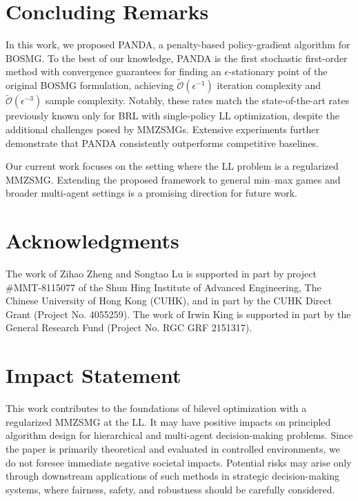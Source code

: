 \documentclass{article}
\theoremstyle{plain}
\theoremstyle{definition}
\theoremstyle{remark}
\def\cO{\mathcal O}
\begin{document}
\vspace{-2mm}

\section{Concluding Remarks}
In this work, we proposed PANDA, a penalty-based policy-gradient algorithm
for BOSMG. To the best of our knowledge, PANDA is the first stochastic
first-order method with convergence guarantees for finding an
$\epsilon$-stationary point of the original BOSMG formulation, achieving
$\tilde{\cO}(\epsilon^{-1})$ iteration complexity and
$\tilde{\cO}(\epsilon^{-3})$ sample complexity. Notably, these rates match
the state-of-the-art rates previously known only for BRL with single-policy
LL optimization, despite the additional challenges posed by MMZSMGs.
Extensive experiments further demonstrate that PANDA consistently outperforms
competitive baselines.

\vspace{-1mm}
Our current work focuses on the setting where the LL problem is a regularized
MMZSMG. Extending the proposed framework to general min--max games and broader
multi-agent settings is a promising direction for future work.



\vspace{-2mm}
\section*{Acknowledgments}
The work of Zihao Zheng and Songtao Lu is supported in part by project \#MMT-8115077 of the Shun Hing Institute of Advanced Engineering, The Chinese University of Hong Kong (CUHK), and in part by the CUHK Direct Grant (Project No. 4055259). The work of Irwin King is supported in part by the General Research Fund (Project No. RGC GRF 2151317). 

\vspace{-3mm}
\section*{Impact Statement}
\vspace{-2mm}

This work contributes to the foundations of bilevel optimization with a regularized MMZSMG at the LL. It may have positive impacts on principled algorithm design for hierarchical and multi-agent decision-making problems. Since the paper is primarily theoretical and evaluated in controlled environments, we do not foresee immediate negative societal impacts. Potential risks may arise only through downstream applications of such methods in strategic decision-making systems, where fairness, safety, and robustness should be carefully considered.
\end{document}

